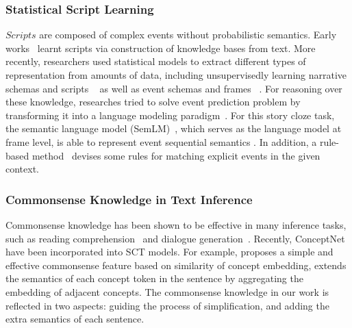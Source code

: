 \subsubsection*{Statistical Script Learning}
$Scripts$ are composed of complex events without probabilistic semantics.
Early works~\cite{schank2013scripts,mooney1985learning} learnt scripts 
via construction of knowledge bases from text. 
More recently, researchers used statistical models to extract different types 
of representation from amounts of data, including unsupervisedly learning 
narrative schemas and scripts
~\cite{chambers2009unsupervised,regneri2011learning} as well as event schemas and frames 
~\cite{chambers2011template, balasubramanian2013generating,sha2016joint,huang2016liberal}.
For reasoning over these knowledge, researches tried to solve event
 prediction problem by transforming it into a language modeling paradigm~\cite{pichotta2014statistical,pichotta2016statistical,pichotta2016using,pichotta2016learning,
 rudinger2015script,hu2017happens}.
For this story cloze task, the semantic language model (SemLM)~\cite{peng2016two},
which serves as the language model at frame level,
is able to represent event sequential semantics
\cite{li2018multi,chaturvedi2017story}. In addition, a rule-based 
method~\cite{lin2017reasoning} devises some rules for matching 
explicit events in the given context. 

\subsubsection*{Commonsense Knowledge in Text Inference}
Commonsense knowledge has been shown to be effective in many
inference tasks,
such as reading comprehension~\cite{mihaylov2018knowledgeable}
and dialogue generation~\cite{liu2018knowledge}.
Recently, ConceptNet have been incorporated into SCT models.
For example,  proposes a simple and
effective commonsense feature based on similarity of concept embedding,
 extends the semantics of each concept token
in the sentence by aggregating the embedding of adjacent concepts.
The commonsense knowledge in our work is reflected in two aspects:
guiding the process of simplification,
and adding the extra semantics of each sentence.







